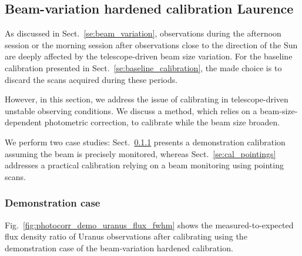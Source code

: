 \subsection{Beam-variation hardened calibration {\color{blue} Laurence} }

As discussed in Sect.~\ref{se:beam_variation}, observations during the
afternoon session or the morning session after observations close to the
direction of the Sun are deeply affected by the telescope-driven beam
size variation. For the baseline calibration presented in
Sect.~\ref{se:baseline_calibration}, the made choice is to discard the
scans acquired during these periods.

However, in this section, we address the issue of calibrating in
telescope-driven unstable observing conditions. We discuss a method,
which relies on a beam-size-dependent photometric correction, to
calibrate while the beam size broaden.

We perform two case studies: Sect.~\ref{se:cal_democase} presents a demonstration
calibration assuming the beam is precisely monitored, whereas
Sect.~\ref{se:cal_pointings} addresses a practical calibration relying
on a beam monitoring using pointing scans. 


\subsubsection{Demonstration case}
\label{se:cal_democase}


Fig.~\ref{fig:photocorr_demo_uranus_flux_fwhm} shows the
measured-to-expected flux density ratio of Uranus observations after
calibrating using the demonstration case of the beam-variation
hardened calibration. 

